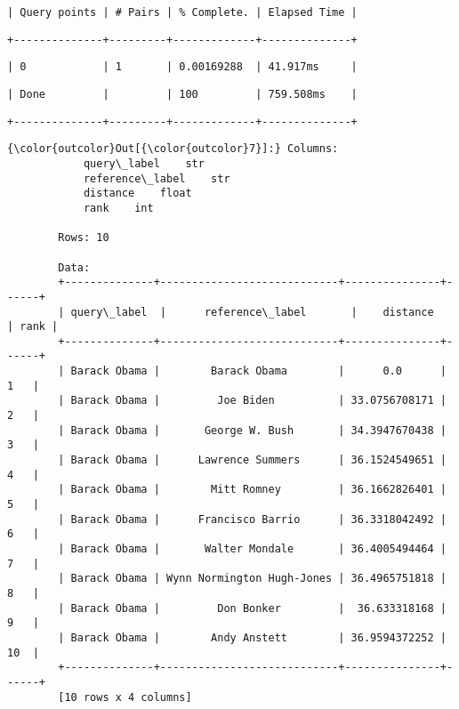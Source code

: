 \documentclass[11pt]{article}
\begin{document}
    
    
    \begin{verbatim}
| Query points | # Pairs | % Complete. | Elapsed Time |
    \end{verbatim}

    
    
    \begin{verbatim}
+--------------+---------+-------------+--------------+
    \end{verbatim}

    
    
    \begin{verbatim}
| 0            | 1       | 0.00169288  | 41.917ms     |
    \end{verbatim}

    
    
    \begin{verbatim}
| Done         |         | 100         | 759.508ms    |
    \end{verbatim}

    
    
    \begin{verbatim}
+--------------+---------+-------------+--------------+
    \end{verbatim}

    
\begin{Verbatim}[commandchars=\\\{\}]
{\color{outcolor}Out[{\color{outcolor}7}]:} Columns:
        	query\_label	str
        	reference\_label	str
        	distance	float
        	rank	int
        
        Rows: 10
        
        Data:
        +--------------+----------------------------+---------------+------+
        | query\_label  |      reference\_label       |    distance   | rank |
        +--------------+----------------------------+---------------+------+
        | Barack Obama |        Barack Obama        |      0.0      |  1   |
        | Barack Obama |         Joe Biden          | 33.0756708171 |  2   |
        | Barack Obama |       George W. Bush       | 34.3947670438 |  3   |
        | Barack Obama |      Lawrence Summers      | 36.1524549651 |  4   |
        | Barack Obama |        Mitt Romney         | 36.1662826401 |  5   |
        | Barack Obama |      Francisco Barrio      | 36.3318042492 |  6   |
        | Barack Obama |       Walter Mondale       | 36.4005494464 |  7   |
        | Barack Obama | Wynn Normington Hugh-Jones | 36.4965751818 |  8   |
        | Barack Obama |         Don Bonker         |  36.633318168 |  9   |
        | Barack Obama |        Andy Anstett        | 36.9594372252 |  10  |
        +--------------+----------------------------+---------------+------+
        [10 rows x 4 columns]
\end{Verbatim}
            
\end{document}
